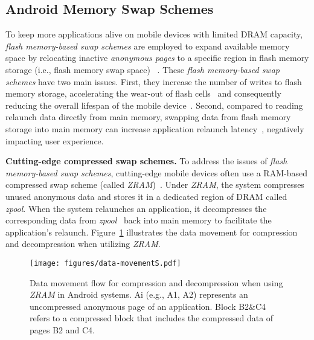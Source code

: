 \subsection{Android Memory Swap Schemes}
To keep more applications alive on mobile devices with limited DRAM capacity, \emph{flash memory-based swap schemes} are employed to expand available memory space by relocating inactive \emph{anonymous pages} to a specific region in flash memory storage (i.e., flash memory swap space) ~\cite{zhu2017revisiting, kim2015cause, liu2017non, zhong2017building, kim2019analysis, zhu2017smartswap, kim2018comparison, oliveira2021extending, oliveira2021extending1}. These \emph{flash memory-based swap schemes} have two main issues. First, they increase the number of writes to flash memory storage, accelerating the wear-out of flash cells~\cite{cai2017error} and consequently reducing the overall lifespan of the mobile device~\cite{luo2015warm, liang2022cachesifter, liu2017non}. Second, compared to reading relaunch data directly from main memory, swapping data from flash memory storage into main memory can increase application relaunch latency~\cite{zhu2017smartswap,end2024more}, negatively impacting user experience.

\noindent\textbf{Cutting-edge compressed swap schemes.} 
To address the issues of \emph{flash memory-based swap schemes}, cutting-edge mobile devices often use a RAM-based compressed swap scheme (called \emph{ZRAM})~\cite{compress1, compress2, zram1, zram2, new-zram, merge-zram,oliveira2021extending, oliveira2021extending1}. 
Under \emph{ZRAM}, the system compresses unused anonymous data and stores it in a dedicated region of DRAM called \emph{zpool}. When the system relaunches an application, it decompresses the corresponding data from \emph{zpool}~\cite{zpool} back into main memory to facilitate the application's relaunch.
Figure~\ref{fig:datamove} illustrates the data movement for compression and decompression when utilizing  \emph{ZRAM}. 

\begin{figure}[!h]
\centering
\texttt{[image: figures/data-movementS.pdf]}
\vspace{-0.4em}
\caption{Data movement flow for compression and decompression when using  \emph{ZRAM} in Android systems. Ai (e.g., A1, A2) represents an uncompressed anonymous page of an application. Block B2\&C4 refers to a compressed block that includes the compressed data of pages B2 and C4.}
\label{fig:datamove}
\end{figure}

